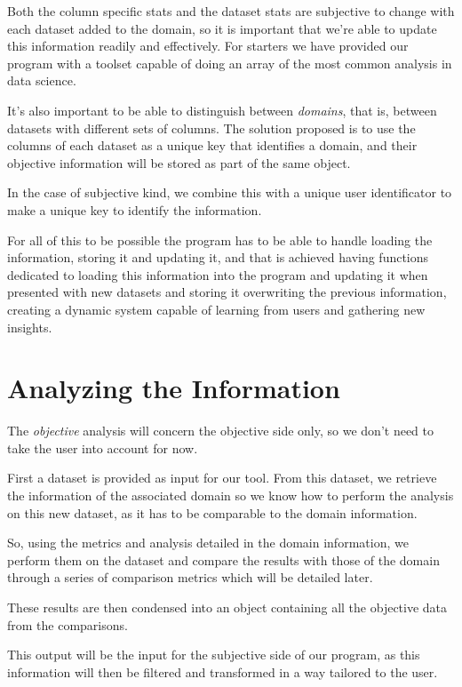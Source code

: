 Both the column specific stats and the dataset stats are subjective to change with each dataset added to the domain, so it is important that we're able to update this information readily and effectively.
For starters we have provided our program with a toolset capable of doing an array of the most common analysis in data science.

It's also important to be able to distinguish between \textit{domains}, that is, between datasets with different sets of columns. The solution proposed is to use the columns of each dataset as a unique key that identifies a domain, and their objective information will be stored as part of the same object.

In the case of subjective kind, we combine this with a unique user identificator to make a unique key to identify the information.

For all of this to be possible the program has to be able to handle loading the information, storing it and updating it, and that is achieved having functions dedicated to loading this information into the program and updating it when presented with new datasets and storing it overwriting the previous information, creating a dynamic system capable of learning from users and gathering new insights.

\section{Analyzing the Information}
\label{cap2:sec:analysis}

The \textit{objective} analysis will concern the objective side only, so we don't need to take the user into account for now.

First a dataset is provided as input for our tool. From this dataset, we retrieve the information of the associated domain so we know how to perform the analysis on this new dataset, as it has to be comparable to the domain information.

So, using the metrics and analysis detailed in the domain information, we perform them on the dataset and compare the results with those of the domain through a series of comparison metrics which will be detailed later.

These results are then condensed into an object containing all the objective data from the comparisons.

This output will be the input for the subjective side of our program, as this information will then be filtered and transformed in a way tailored to the user.

